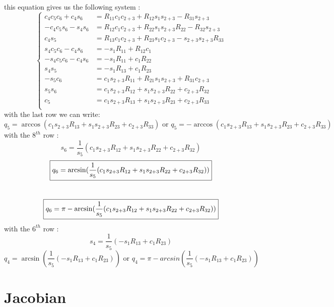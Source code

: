 \documentclass{article}
\begin{document}
this equation gives us the following system :
\begin{equation}
\begin{cases}
  c_4c_5c_6+c_4s_6&=R_{11}c_1c_{2+3}+R_{12}s_1s_{2+3}-R_{31}s_{2+3}\\
  -c_4c_5s_6-s_4s_6&=R_{12}c_1c_{2+3}+R_{22}s_1s_{2+3}R_{22}-R_{32}s_{2+3}\\
  c_4s_5&=R_{13}c_1c_{2+3}+R_{23}s_1c_{2+3}-s_{2+3}s_{2+3}R_{33}\\
  s_4c_5c_6-c_4s_6&=-s_1R_{11}+R_{12}c_1\\
  -s_4c_5c_6-c_4s_6&=-s_1R_{11}+c_1R_{22}\\
  s_4s_5&=-s_1R_{13}+c_1R_{23}\\
  -s_5c_6&=c_1s_{2+3}R_{11}+R_{21}s_1s_{2+3}+R_{31}c_{2+3}\\
  s_5s_6&=c_1s_{2+3}R_{12}+s_1s_{2+3}R_{22}+c_{2+3}R_{32}\\
  c_5&=c_1s_{2+3}R_{13}+s_1s_{2+3}R_{23}+c_{2+3}R_{33}\\
\end{cases}
\end{equation}
with the last row we can write:
\begin{equation*}
  \boxed{q_5=\arccos(c_1s_{2+3}R_{13}+s_1s_{2+3}R_{23}+c_{2+3}R_{33})}
  \text{ or }
  \boxed{q_5=-\arccos(c_1s_{2+3}R_{13}+s_1s_{2+3}R_{23}+c_{2+3}R_{33})}
\end{equation*}
with the $8^{th}$ row :
\begin{equation}
  s_6=\frac{1}{s_5}(c_1s_{2+3}R_{12}+s_1s_{2+3}R_{22}+c_{2+3}R_{32})
\end{equation}
\[
\boxed{q_6=\arcsin(\frac{1}{s_5}(c_1s_{2+3}R_{12}+s_1s_{2+3}R_{22}+c_{2+3}R_{32}))}\\
\]
\\
\[
\boxed{q_6=\pi-\arcsin(\frac{1}{s_5}(c_1s_{2+3}R_{12}+s_1s_{2+3}R_{22}+c_{2+3}R_{32}))}\\
\]
with the $6^{th}$ row :
\begin{equation}
  s_4=\frac{1}{s_5}(-s_1R_{13}+c_1R_{23})
\end{equation}
\[
\boxed{q_4=\arcsin(\frac{1}{s_5}(-s_1R_{13}+c_1R_{23}))}
\text{ or }
\boxed{q_4=\pi-arcsin(\frac{1}{s_5}(-s_1R_{13}+c_1R_{23}))}
\]




\section{Jacobian}
\end{document}
